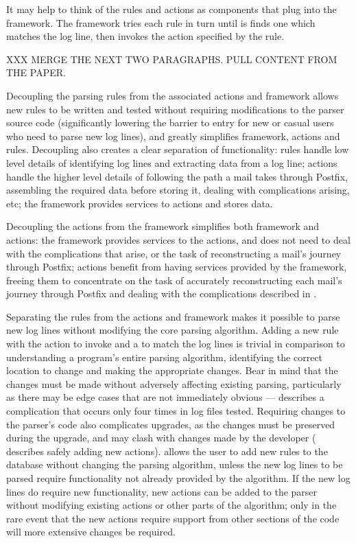 It may help to think of the rules and actions as components that plug into
the framework.  The framework tries each rule in turn until is finds one
which matches the log line, then invokes the action specified by the rule.

\label{why separate rules, actions and framework?}

XXX MERGE THE NEXT TWO PARAGRAPHS\@.  PULL CONTENT FROM THE PAPER\@.

Decoupling the parsing rules from the associated actions and framework
allows new rules to be written and tested without requiring modifications
to the parser source code (significantly lowering the barrier to entry for
new or casual users who need to parse new log lines), and greatly
simplifies framework, actions and rules.  Decoupling also creates a clear
separation of functionality: rules handle low level details of identifying
log lines and extracting data from a log line; actions handle the higher
level details of following the path a mail takes through Postfix,
assembling the required data before storing it, dealing with complications
arising, etc; the framework provides services to actions and stores data.

Decoupling the actions from the framework simplifies both framework and
actions: the framework provides services to the actions, and does not need
to deal with the complications that arise, or the task of reconstructing a
mail's journey through Postfix; actions benefit from having services
provided by the framework, freeing them to concentrate on the task of
accurately reconstructing each mail's journey through Postfix and dealing
with the complications described in .

Separating the rules from the actions and framework makes it possible to
parse new log lines without modifying the core parsing algorithm.  Adding a
new rule with the action to invoke and a \regex{} to match the log lines is
trivial in comparison to understanding a program's entire parsing
algorithm, identifying the correct location to change and making the
appropriate changes.  Bear in mind that the changes must be made without
adversely affecting existing parsing, particularly as there may be edge
cases that are not immediately obvious ---
 describes a complication
that occurs only four times in \numberOFlogFILES{} log files tested.
Requiring changes to the parser's code also complicates upgrades, as the
changes must be preserved during the upgrade, and may clash with changes
made by the developer ( describes safely
adding new actions).  \parsername{} allows the user to add new rules to the
database without changing the parsing algorithm, unless the new log lines
to be parsed require functionality not already provided by the algorithm.
If the new log lines do require new functionality, new actions can be added
to the parser without modifying existing actions or other parts of the
algorithm; only in the rare event that the new actions require support from
other sections of the code will more extensive changes be required.

